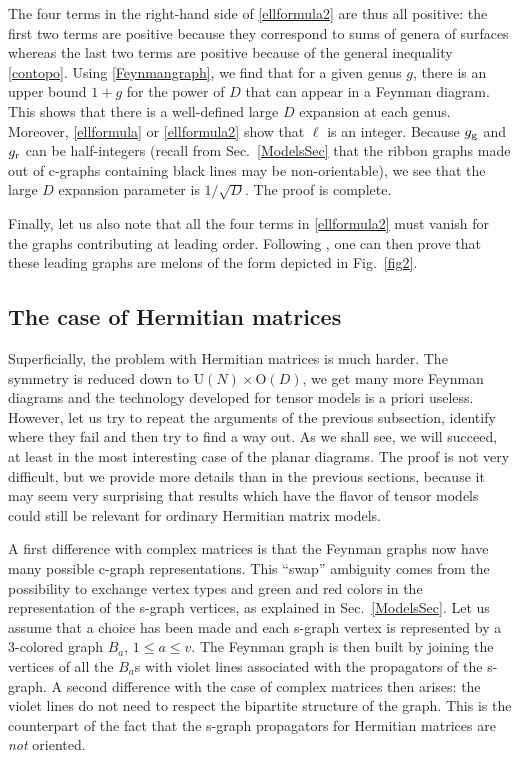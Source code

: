 \documentclass[12pt]{article}
\numberwithin{equation}{section}
\begin{document}
The four terms in the right-hand side of \eqref{ellformula2} are thus all positive: the first two terms are positive because they correspond to sums of genera of surfaces whereas the last two terms are positive because of the general inequality \eqref{contopo}. Using \eqref{Feynmangraph}, we find that for a given genus $g$, there is an upper bound $1+g$ for the power of $D$ that can appear in a Feynman diagram. This shows that there is a well-defined large $D$ expansion at each genus. Moreover, \eqref{ellformula} or \eqref{ellformula2} show that $\ell$ is an integer. Because $g_{\text g}$ and $g_{\text r}$ can be half-integers (recall from Sec.\ \ref{ModelsSec} that the ribbon graphs made out of c-graphs containing black lines may be non-orientable), we see that the large $D$ expansion parameter is $1/\sqrt{D}$. The proof is complete.

Finally, let us also note that all the four terms in \eqref{ellformula2} must vanish for the graphs contributing at leading order. Following \cite{Carrozzaetal}, one can then prove that these leading graphs are melons of the form depicted in Fig.\ \ref{fig2}.

%
\subsection{\label{HermitianSec} The case of Hermitian matrices}
%

Superficially, the problem with Hermitian matrices is much harder. The symmetry is reduced down to $\text{U}(N)\times\text{O}(D)$, we get many more Feynman diagrams and the technology developed for tensor models is a priori useless. However, let us try to repeat the arguments of the previous subsection, identify where they fail and then try to find a way out. As we shall see, we will succeed, at least in the most interesting case of the planar diagrams. The proof is not very difficult, but we provide more details than in the previous sections, because it may seem very surprising that results which have the flavor of tensor models could still be relevant for ordinary Hermitian matrix models.

A first difference with complex matrices is that the Feynman graphs now have many possible c-graph representations. This ``swap'' ambiguity comes from the possibility to exchange vertex types and green and red colors in the representation of the s-graph vertices, as explained in Sec.\ \ref{ModelsSec}. Let us assume that a choice has been made and each s-graph vertex is represented by a 3-colored graph $B_{a}$, $1\leq a\leq v$. The Feynman graph is then built by joining the vertices of all the $B_{a}$s with violet lines associated with the propagators of the s-graph. A second difference with the case of complex matrices then arises: the violet lines do not need to respect the bipartite structure of the graph. This is the counterpart of the fact that the s-graph propagators for Hermitian matrices are \emph{not} oriented.
\end{document}
